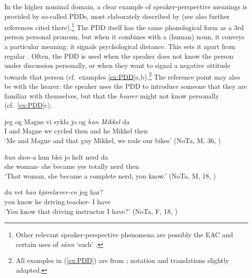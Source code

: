 \documentclass[output=paper]{langsci/langscibook}
\begin{document}
In the higher nominal domain, a clear example of speaker-perspective meanings
is provided by so-called \glspl{PDD}, most elaborately described by
\citet{johannessen2008psycological} (see also further references cited
there).\footnote{Other relevant speaker-perspective phenomena are possibly the
\gls{EAC} \parencite[294--297]{halmoy2016nominal} and certain uses of \emph{sånn}
`such' \parencite{johannessen2012modale}.}  The
\gls{PDD} itself has the same phonological form as a 3rd person personal
pronoun, but when it combines with a (human) noun, it conveys a particular
meaning: it signals psychological distance.  This  sets it apart from regular
. Often, the \gls{PDD} is used when the speaker does not know the
person under discussion personally, or when they want to signal a negative
attitude towards that person (cf.\ examples \ref{ex:PDD}a,b).\footnote{All
examples in (\ref{ex:PDD}) are from \citet{johannessen2008psycological};
notation and translations slightly adapted.} The reference point may also be
with the hearer: the speaker uses the \gls{PDD} to introduce someone that they
are familiar with themselves, but that the \emph{hearer} might not know
personally  (cf.\ \ref{ex:PDD}c).\largerpage[-2]

\ea \label{ex:PDD} 
    \ea
    \gll jeg og Magne vi sykla jo og \textit{han} \textit{Mikkel} da\\
    I and Magne we cycled then and he Mikkel then\\
    \glt `Me and Magne and that guy Mikkel, we rode  our bikes' (NoTa, M, 36, \citealt[164]{johannessen2008psycological}	)

\ex
\gll \textit{hun} \textit{dam-a} hun blei jo helt nerd da\\
she woman-\Def{} she became yes totally nerd then\\
\glt `That woman, she became a complete nerd, you know.' (NoTa, M, 18, \citealt[166]{johannessen2008psycological})

	\ex
\gll du vet \textit{han} \textit{kj\o{}rel\ae{}rer-en} jeg har?\\
you know he driving.teacher-\Def{} I have\\
\glt `You know that driving instructor I have?' (NoTa, F, 18, \citealt[164]{johannessen2008psycological})
		\z
\z
\end{document}
